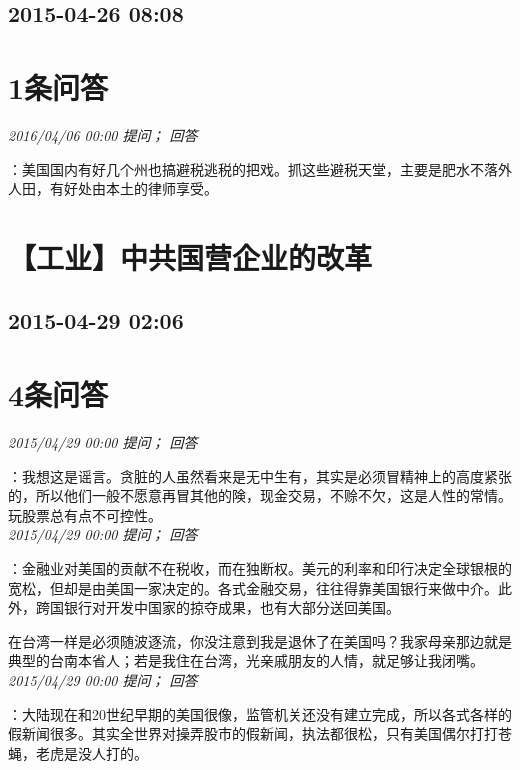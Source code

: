 \documentclass[twocolumn]{ctexart}
\begin{document}
\subsection{2015-04-26 08:08}


\section{1条问答}

\textit{\hfill\noindent\small 2016/04/06 00:00 提问； 回答}

：美国国内有好几个州也搞避税逃税的把戏。抓这些避税天堂，主要是肥水不落外人田，有好处由本土的律师享受。\\


\section{【工业】中共国营企业的改革}
\subsection{2015-04-29 02:06}


\section{4条问答}

\textit{\hfill\noindent\small 2015/04/29 00:00 提问； 回答}

：我想这是谣言。贪脏的人虽然看来是无中生有，其实是必须冒精神上的高度紧张的，所以他们一般不愿意再冒其他的険，现金交易，不赊不欠，这是人性的常情。玩股票总有点不可控性。\\

\textit{\hfill\noindent\small 2015/04/29 00:00 提问； 回答}

：金融业对美国的贡献不在税收，而在独断权。美元的利率和印行决定全球银根的宽松，但却是由美国一家决定的。各式金融交易，往往得靠美国银行来做中介。此外，跨国银行对开发中国家的掠夺成果，也有大部分送回美国。

在台湾一样是必须随波逐流，你没注意到我是退休了在美国吗？我家母亲那边就是典型的台南本省人；若是我住在台湾，光亲戚朋友的人情，就足够让我闭嘴。\\

\textit{\hfill\noindent\small 2015/04/29 00:00 提问； 回答}

：大陆现在和20世纪早期的美国很像，监管机关还没有建立完成，所以各式各样的假新闻很多。其实全世界对操弄股市的假新闻，执法都很松，只有美国偶尔打打苍蝇，老虎是没人打的。
\end{document}
